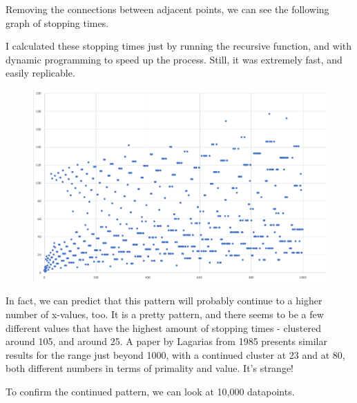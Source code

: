 \documentclass{article}
\theoremstyle{remark}
\theoremstyle{problem}
\numberwithin{problem}{subsection}
\numberwithin{Problem}{section}
\theoremstyle{definition}
\theoremstyle{definition}
\theoremstyle{definition}
\begin{document}
Removing the connections between adjacent points, we can see the following graph of stopping times.

I calculated these stopping times just by running the recursive function, and with dynamic programming to speed up the process. Still, it was extremely fast, and easily replicable.


\begin{figure}
\includegraphics[width = 0.7 \textwidth]{images/1000 Collatz Stopping Times.png}

\end{figure}

In fact, we can predict that this pattern will probably continue to a higher number of x-values, too. It is a pretty pattern, and there seems to be a few different values that have the highest amount of stopping times - clustered around 105, and around 25. A paper by Lagarias from 1985 presents similar results for the range just beyond 1000, with a continued cluster at 23 and at 80, both different numbers in terms of primality and value. It's strange!


To confirm the continued pattern, we can look at 10,000 datapoints. 
\end{document}
